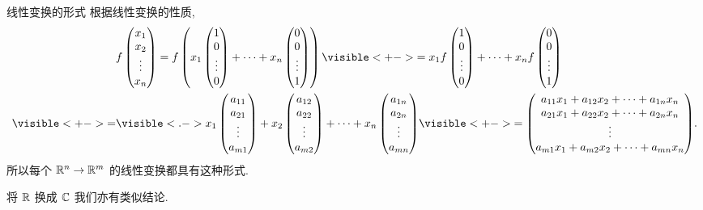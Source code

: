 \begin{frame}{线性变换的形式}
	\onslide<+->
	根据线性变换的性质,
	\begin{align*}
		&f\begin{pmatrix}
			x_1\\x_2\\\vdots\\x_n
		\end{pmatrix}
		=f\left(x_1\begin{pmatrix}
			1\\0\\\vdots\\0
		\end{pmatrix}+\dots+x_n\begin{pmatrix}
			0\\0\\\vdots\\1
		\end{pmatrix}\right)
		\visible<+->{=x_1f\begin{pmatrix}
			1\\0\\\vdots\\0
		\end{pmatrix}+\dots+x_nf\begin{pmatrix}
			0\\0\\\vdots\\1
		\end{pmatrix}}\\
		\visible<+->{=}&\visible<.->{x_1\begin{pmatrix}
			a_{11}\\a_{21}\\\vdots\\a_{m1}
		\end{pmatrix}+x_2\begin{pmatrix}
			a_{12}\\a_{22}\\\vdots\\a_{m2}
		\end{pmatrix}+\dots+x_n\begin{pmatrix}
			a_{1n}\\a_{2n}\\\vdots\\a_{mn}
		\end{pmatrix}}
		\visible<+->{=\begin{pmatrix}
			a_{11}x_1+a_{12}x_2+\cdots+a_{1n}x_n\\
			a_{21}x_1+a_{22}x_2+\cdots+a_{2n}x_n\\
			\vvdots\\
			a_{m1}x_1+a_{m2}x_2+\cdots+a_{mn}x_n
		\end{pmatrix}}.
	\end{align*}
	\onslide<+->
	所以每个 ${\mathbb{R}}^n\to{\mathbb{R}}^m$ 的线性变换都具有这种形式.

	\onslide<+->
	将 ${\mathbb{R}}$ 换成 ${\mathbb{C}}$ 我们亦有类似结论.
\end{frame}



